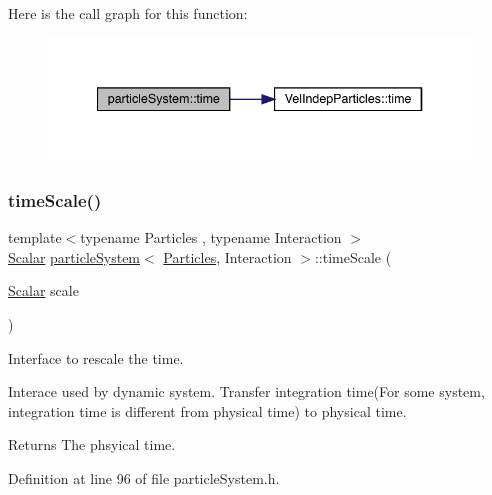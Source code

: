 Here is the call graph for this function\+:\nopagebreak
\begin{figure}[H]
\begin{center}
\leavevmode
\includegraphics[width=340pt]{classparticle_system_a25bf169b4acd1ede1dd03a218d5f105c_cgraph}
\end{center}
\end{figure}
\mbox{\label{classparticle_system_a803227b33f7c25f28fb0575cf798d1a8}} 
\subsubsection{\texorpdfstring{time\+Scale()}{timeScale()}}
{\footnotesize\ttfamily template$<$typename Particles , typename Interaction $>$ \\
\mbox{\hyperlink{classparticle_system_a3938954186247e3eab01cc75fcc62b40}{Scalar}} \mbox{\hyperlink{classparticle_system}{particle\+System}}$<$ \mbox{\hyperlink{struct_particles}{Particles}}, Interaction $>$\+::time\+Scale (\begin{DoxyParamCaption}\item[{\mbox{\hyperlink{classparticle_system_a3938954186247e3eab01cc75fcc62b40}{Scalar}}}]{scale }\end{DoxyParamCaption})\hspace{0.3cm}{\ttfamily [inline]}}



Interface to rescale the time. 

Interace used by dynamic system. Transfer integration time(For some system, integration time is different from physical time) to physical time. \begin{DoxyReturn}{Returns}
The phsyical time. 
\end{DoxyReturn}


Definition at line 96 of file particle\+System.\+h.

\mbox{\label{classparticle_system_a4609f37fb9055bc71f14dbf6738017ba}} 
